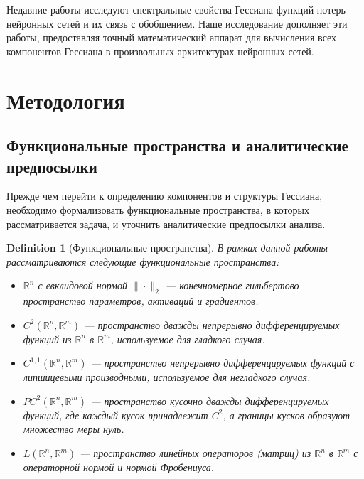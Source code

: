 \documentclass[11pt]{article}
\newtheorem{definition}{Definition}
\begin{document}
Недавние работы \citep{ghorbani2019investigation, sagun2017empirical} исследуют спектральные свойства
Гессиана функций потерь нейронных сетей и их связь с обобщением. Наше исследование дополняет эти работы,
предоставляя точный математический аппарат для вычисления всех компонентов Гессиана в произвольных
архитектурах нейронных сетей.

\section{Методология}

\subsection{Функциональные пространства и аналитические предпосылки}

Прежде чем перейти к определению компонентов и структуры Гессиана, необходимо формализовать функциональные
пространства, в которых рассматривается задача, и уточнить аналитические предпосылки анализа.

\begin{definition}[Функциональные пространства]
  В рамках данной работы рассматриваются следующие функциональные пространства:
  \begin{itemize}
    \item $\mathbb{R}^n$ с евклидовой нормой $\|\cdot\|_2$ — конечномерное гильбертово пространство
      параметров, активаций и градиентов.
    \item $C^2(\mathbb{R}^n, \mathbb{R}^m)$ — пространство дважды непрерывно дифференцируемых функций из
      $\mathbb{R}^n$ в $\mathbb{R}^m$, используемое для гладкого случая.
    \item $C^{1,1}(\mathbb{R}^n, \mathbb{R}^m)$ — пространство непрерывно дифференцируемых функций с
      липшицевыми производными, используемое для негладкого случая.
    \item $PC^2(\mathbb{R}^n, \mathbb{R}^m)$ — пространство кусочно дважды дифференцируемых функций, где
      каждый кусок принадлежит $C^2$, а границы кусков образуют множество меры нуль.
    \item $L(\mathbb{R}^n, \mathbb{R}^m)$ — пространство линейных операторов (матриц) из $\mathbb{R}^n$ в
      $\mathbb{R}^m$ с операторной нормой и нормой Фробениуса.
  \end{itemize}
\end{definition}
\end{document}
